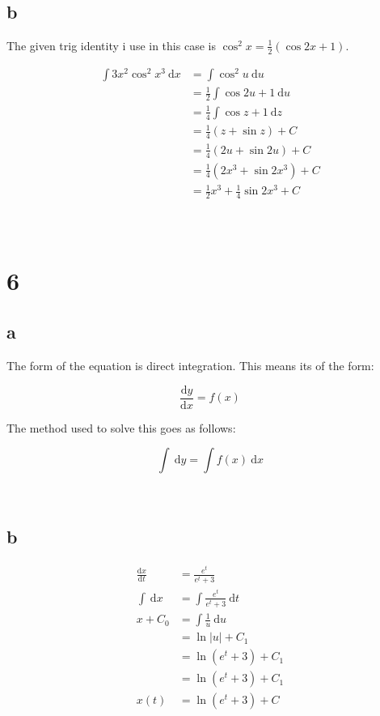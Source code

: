 \documentclass{article}
\newcommand{\md}{~\mathrm d}
\newcommand{\Md}{\mathrm d}
\newcommand{\blankpage}{
    \newpage
    \
    \newpage
}
\begin{document}
\blankpage
\subsection{b}

The given trig identity i use in this case is $\cos^2 x = \frac 12 (\cos 2x + 1)$.

\begin{align*}
    \int 3x^2 \cos^2 x^3 \md x &= \int \cos^2 u \md u \\
                               &= \frac12 \int \cos 2u + 1 \md u \\
                               &= \frac14 \int \cos z + 1 \md z \\
                               &= \frac14 (z + \sin z) + C \\
                               &= \frac14 (2u + \sin 2u) + C\\
                               &= \frac14 (2x^3 + \sin 2x^3) + C\\
                               &= \frac12x^3 + \frac14\sin 2x^3 + C\\
\end{align*}

\blankpage
\section{6}
\subsection{a}

The form of the equation is direct integration. This means its of the form:

$$\frac{\Md y}{\Md x} = f(x)$$

The method used to solve this goes as follows:

$$\int\md y = \int f(x)\md x$$

\blankpage
\subsection{b}

\begin{align*}
    \frac{\Md x}{\Md t} &= \frac{e^t}{e^t + 3} \\
    \int\md x &= \int\frac{e^t}{e^t + 3}\md t \\
    x + C_0   &= \int\frac 1 u \md u \\
              &= \ln |u| + C_1 \\
              &= \ln (e^t + 3) + C_1 \\
              &= \ln (e^t + 3) + C_1 \\
    x(t)      &= \ln (e^t + 3) + C
\end{align*}
\end{document}
